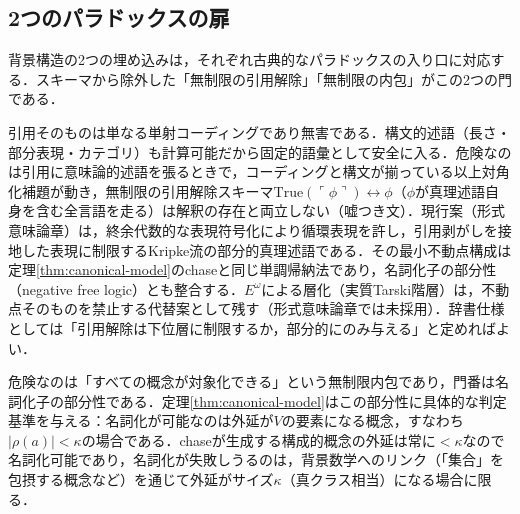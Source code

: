 \documentclass[../../main-detail.tex]{subfiles}
\begin{document}
\subsection{2つのパラドックスの扉}\label{subsec:paradox-doors}
背景構造の2つの埋め込みは，それぞれ古典的なパラドックスの入り口に対応する．スキーマから除外した「無制限の引用解除」「無制限の内包」がこの2つの門である．
\begin{remark}[表現の埋め込みとTarskiの扉]
    引用そのものは単なる単射コーディングであり無害である．構文的述語（長さ・部分表現・カテゴリ）も計算可能だから固定的語彙として安全に入る．危険なのは引用に意味論的述語を張るときで，コーディングと構文が揃っている以上対角化補題が動き，無制限の引用解除スキーマ$\mathrm{True}(\ulcorner \phi \urcorner) \leftrightarrow \phi$（$\phi$が真理述語自身を含む全言語を走る）は解釈の存在と両立しない（嘘つき文）．現行案（形式意味論章）は，終余代数的な表現符号化により循環表現を許し，引用剥がしを接地した表現に制限するKripke流の部分的真理述語\cite{kripke-truth}である．その最小不動点構成は定理\ref{thm:canonical-model}のchaseと同じ単調帰納法であり，名詞化子の部分性（negative free logic）とも整合する．$E^\omega$による層化（実質Tarski階層）は，不動点そのものを禁止する代替案として残す（形式意味論章では未採用）．辞書仕様としては「引用解除は下位層に制限するか，部分的にのみ与える」と定めればよい．
\end{remark}
\begin{remark}[数学の埋め込みとRussellの扉]
    危険なのは「すべての概念が対象化できる」という無制限内包であり，門番は名詞化子の部分性である．定理\ref{thm:canonical-model}はこの部分性に具体的な判定基準を与える：名詞化が可能なのは外延が$V$の要素になる概念，すなわち$|\rho(a)| < \kappa$の場合である．chaseが生成する構成的概念の外延は常に$<\kappa$なので名詞化可能であり，名詞化が失敗しうるのは，背景数学へのリンク（「集合」を包摂する概念など）を通じて外延がサイズ$\kappa$（真クラス相当）になる場合に限る．
\end{remark}
\end{document}
